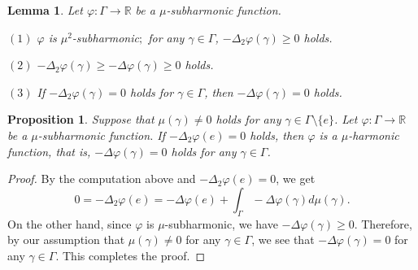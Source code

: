 \documentclass[12pt]{amsart}
\numberwithin{equation}{section}
\theoremstyle{plain}
\newtheorem{Proposition}[Theorem]{Proposition}
\newtheorem{Lemma}[Theorem]{Lemma}
\theoremstyle{definition}
\theoremstyle{remark}
\newcommand{\R}{{\mathbb R}}
\begin{document}
\begin{Lemma}
 \label{lem:mu^k-subharmonicity}
 Let  $\varphi\colon \Gamma \rightarrow \R$ be a $\mu$-subharmonic
 function. 

 $(1)$ $\varphi$ is $\mu^2$-subharmonic$;$ for any $\gamma \in \Gamma$,
 $-\Delta_2 \varphi(\gamma)\geq 0$ holds. 

 $(2)$ 
 $-\Delta_2 \varphi(\gamma) \geq -\Delta \varphi(\gamma)\geq 0$
 holds. 

 $(3)$ If $-\Delta_2 \varphi(\gamma)=0$ holds for $\gamma \in \Gamma$,
 then $-\Delta \varphi(\gamma)=0$ holds. 
\end{Lemma}

%
%
\begin{Proposition}
 \label{prop:k-step_harmonicity}
 Suppose that $\mu(\gamma)\not= 0$ holds for any 
 $\gamma \in \Gamma \setminus \{e\}$. 
 Let $\varphi \colon \Gamma \longrightarrow \R$ be a $\mu$-subharmonic
 function. 
 If  $-\Delta_2 \varphi(e)=0$ holds, then $\varphi$ is a $\mu$-harmonic
 function, that is, $-\Delta \varphi(\gamma)=0$ holds for any 
 $\gamma \in \Gamma$. 
\end{Proposition}

\begin{proof}
 By the computation above and $-\Delta_2\varphi(e)=0$, we get
\begin{equation*}
    0= -\Delta_2 \varphi(e) 
    = -\Delta \varphi(e) + 
    \int_{\Gamma}-\Delta \varphi (\gamma)  d\mu(\gamma). 
\end{equation*}
 On the other hand, since $\varphi$ is $\mu$-subharmonic, we have 
 $-\Delta\varphi(\gamma)\geq 0$. 
 Therefore, by our assumption that $\mu(\gamma)\not= 0$ for any 
 $\gamma \in \Gamma$, we see that $-\Delta \varphi(\gamma)=0$ for any
 $\gamma \in \Gamma$. 
 This completes the proof.
 \end{proof}
\end{document}
